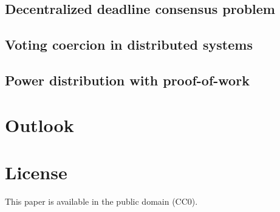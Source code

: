 \documentclass[9pt,oneside]{amsart}
\begin{document}
\begin{multicols}{2}
\subsection{Decentralized deadline consensus problem}

\subsection{Voting coercion in distributed systems}



\subsection{Power distribution with proof-of-work}

\section{Outlook}

\section{License}
This paper is available in the public domain (CC0).


\end{multicols}
\end{document}
